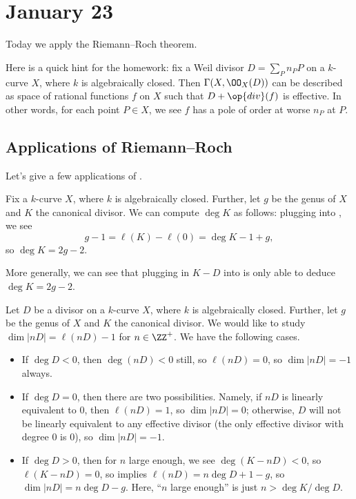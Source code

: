 \documentclass[../notes.tex]{subfiles}
\begin{document}
\section{January 23}

Today we apply the Riemann--Roch theorem.
\begin{remark}
	Here is a quick hint for the homework: fix a Weil divisor $D=\sum_Pn_PP$ on a $k$-curve $X$, where $k$ is algebraically closed. Then $\Gamma(X,\OO_X(D))$ can be described as space of rational functions $f$ on $X$ such that $D+\op{div}(f)$ is effective. In other words, for each point $P\in X$, we see $f$ has a pole of order at worse $n_P$ at $P$.
\end{remark}

\subsection{Applications of Riemann--Roch}
Let's give a few applications of .
\begin{example} \label{ex:compute-deg-k}
	Fix a $k$-curve $X$, where $k$ is algebraically closed. Further, let $g$ be the genus of $X$ and $K$ the canonical divisor. We can compute $\deg K$ as follows: plugging into , we see
	\[g-1=\ell(K)-\ell(0)=\deg K-1+g,\]
	so $\deg K=2g-2$.
\end{example}
\begin{remark}
	More generally, we can see that plugging in $K-D$ into  is only able to deduce $\deg K=2g-2$.
\end{remark}
\begin{example}
	Let $D$ be a divisor on a $k$-curve $X$, where $k$ is algebraically closed. Further, let $g$ be the genus of $X$ and $K$ the canonical divisor. We would like to study $\dim|nD|=\ell(nD)-1$ for $n\in\ZZ^+$. We have the following cases.
	\begin{itemize}
		\item If $\deg D<0$, then $\deg(nD)<0$ still, so $\ell(nD)=0$, so $\dim|nD|=-1$ always.
		\item If $\deg D=0$, then there are two possibilities. Namely, if $nD$ is linearly equivalent to $0$, then $\ell(nD)=1$, so $\dim|nD|=0$; otherwise, $D$ will not be linearly equivalent to any effective divisor (the only effective divisor with degree $0$ is $0$), so $\dim|nD|=-1$.
		\item If $\deg D>0$, then for $n$ large enough, we see $\deg(K-nD)<0$, so $\ell(K-nD)=0$, so  implies $\ell(nD)=n\deg D+1-g$, so $\dim|nD|=n\deg D-g$. Here, ``$n$ large enough'' is just $n>\deg K/\deg D$.
	\end{itemize}
\end{example}
\end{document}
